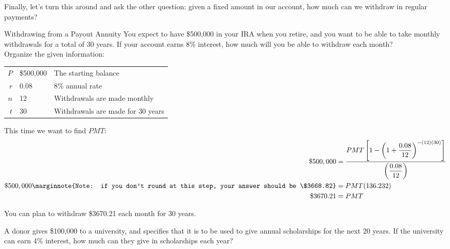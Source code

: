 Finally, let's turn this around and ask the other question: given a fixed amount in our account, how much can we withdraw in regular payments?

\begin{example}[https://www.youtube.com/watch?v=BsqVTSoWOm8]{Withdrawing from a Payout Annuity}
You expect to have \$500,000 in your IRA when you retire, and you want to be able to take monthly withdrawals for a total of 30 years.  If your account earns 8\% interest, how much will you be able to withdraw each month?\\

Organize the given information:
\begin{center}
\begin{tabular}{r l l}
$P$ & \$500,000 & The starting balance\\
$r$ & 0.08 & 8\% annual rate\\
$n$ & 12 & Withdrawals are made monthly\\
$t$ & 30 & Withdrawals are made for 30 years
\end{tabular}
\end{center}

This time we want to find $PMT$:
\begin{align*}
\$500,000 &= \dfrac{PMT\left[1-\left(1+\dfrac{0.08}{12}\right)^{-(12)(30)}\right]}{\left(\dfrac{0.08}{12}\right)}\\
\$500,000\marginnote{Note: if you don't round at this step, your answer should be \$3668.82} &= PMT(136.232)\\
\$3670.21 &= PMT
\end{align*}

You can plan to withdraw \$3670.21 each month for 30 years.
\end{example}

\begin{try}
A donor gives \$100,000 to a university, and specifies that it is to be used to give annual scholarships for the next 20 years.  If the university can earn 4\% interest, how much can they give in scholarships each year?
\end{try}


